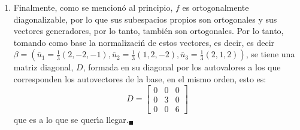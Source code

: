 \begin{solucion}
\begin{enumerate}[$a$)]
  \item Finalmente, como se mencion\'o al principio, $f$ es ortogonalmente diagonalizable, por lo que sus subespacios propios son ortogonales y sus vectores generadores, por lo tanto, tambi\'en son ortogonales. Por lo tanto, tomando como base la normalizaci\'n de estos vectores, es decir, es decir $\beta = \left( \bar{u}_1 = \frac{1}{3}(2,-2,-1), \bar{u}_2 = \frac{1}{3}(1,2,-2), \bar{u}_3 = \frac{1}{3}(2,1,2) \right)$, se tiene una matriz diagonal, $D$, formada en su diagonal por los autovalores a los que corresponden los autovectores de la base, en el mismo orden, esto es:
  \begin{equation*}
   D = 
   \begin{bmatrix}
    0 & 0 & 0 \\
    0 & 3 & 0 \\
    0 & 0 & 6
   \end{bmatrix}
  \end{equation*}
  que es a lo que se quer\'{\i}a llegar.${}_{\blacksquare}$
 \end{enumerate}
\end{solucion}
